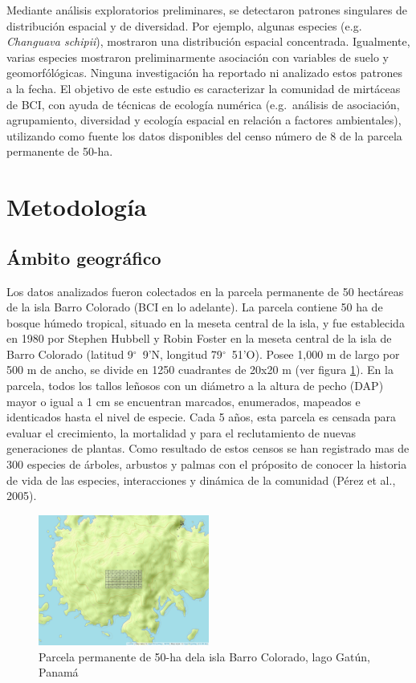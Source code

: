 \documentclass[11pt,]{article}
\begin{document}
Mediante análisis exploratorios preliminares, se detectaron patrones
singulares de distribución espacial y de diversidad. Por ejemplo,
algunas especies (e.g. \emph{Changuava schipii}), mostraron una
distribución espacial concentrada. Igualmente, varias especies mostraron
preliminarmente asociación con variables de suelo y geomorfólógicas.
Ninguna investigación ha reportado ni analizado estos patrones a la
fecha. El objetivo de este estudio es caracterizar la comunidad de
mirtáceas de BCI, con ayuda de técnicas de ecología numérica
(e.g.~análisis de asociación, agrupamiento, diversidad y ecología
espacial en relación a factores ambientales), utilizando como fuente los
datos disponibles del censo número de 8 de la parcela permanente de
50-ha.

\section{Metodología}\label{metodologuxeda}

\subsection{Ámbito geográfico}\label{uxe1mbito-geogruxe1fico}

Los datos analizados fueron colectados en la parcela permanente de 50
hectáreas de la isla Barro Colorado (BCI en lo adelante). La parcela
contiene 50 ha de bosque húmedo tropical, situado en la meseta central
de la isla, y fue establecida en 1980 por Stephen Hubbell y Robin Foster
en la meseta central de la isla de Barro Colorado (latitud
9\(^\circ\)~9'N, longitud 79\(^\circ\)~51'O). Posee 1,000 m de largo por
500 m de ancho, se divide en 1250 cuadrantes de 20x20 m (ver figura
\ref{fig:mapa_cuadros_bci}). En la parcela, todos los tallos leñosos con
un diámetro a la altura de pecho (DAP) mayor o igual a 1 cm se
encuentran marcados, enumerados, mapeados e identicados hasta el nivel
de especie. Cada 5 años, esta parcela es censada para evaluar el
crecimiento, la mortalidad y para el reclutamiento de nuevas
generaciones de plantas. Como resultado de estos censos se han
registrado mas de 300 especies de árboles, arbustos y palmas con el
próposito de conocer la historia de vida de las especies, interacciones
y dinámica de la comunidad (Pérez et al., 2005).

\begin{figure}
\centering
\includegraphics[width=0.50000\textwidth]{mapa_cuadros.png}
\caption{Parcela permanente de 50-ha dela isla Barro Colorado, lago
Gatún, Panamá \label{fig:mapa_cuadros_bci}}
\end{figure}
\end{document}
